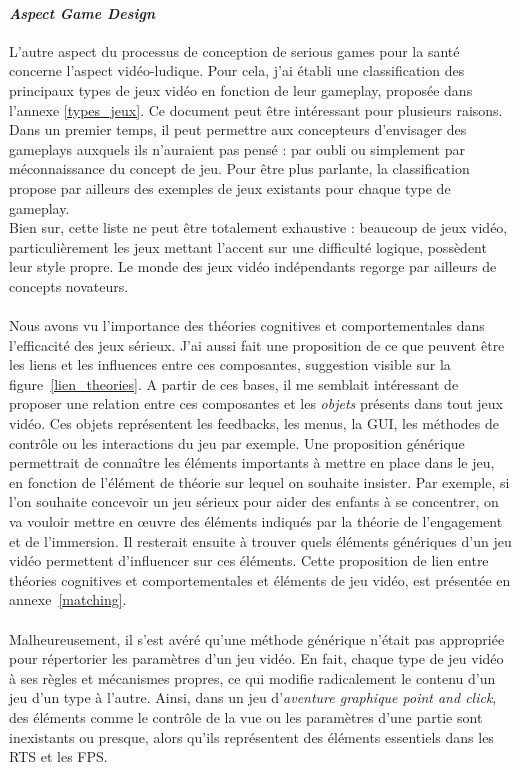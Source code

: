 			\paragraph{\emph{Aspect Game Design}\\}
L'autre aspect du processus de conception de serious games pour la santé concerne l'aspect vidéo-ludique. Pour cela, j'ai établi une classification des principaux types de jeux vidéo en fonction de leur gameplay, proposée dans l'annexe \ref{types_jeux}. Ce document peut être intéressant pour plusieurs raisons. Dans un premier temps, il peut permettre aux concepteurs d'envisager des gameplays auxquels ils n'auraient pas pensé : par oubli ou simplement par méconnaissance du concept de jeu. Pour être plus parlante, la classification propose par ailleurs des exemples de jeux existants pour chaque type de gameplay. \\
Bien sur, cette liste ne peut être totalement exhaustive : beaucoup de jeux vidéo, particulièrement les jeux mettant l'accent sur une difficulté logique, possèdent leur style propre. Le monde des jeux vidéo indépendants regorge par ailleurs de concepts novateurs.

			\paragraph{}
Nous avons vu l'importance des théories cognitives et comportementales dans l'efficacité des jeux sérieux. J'ai aussi fait une proposition de ce que peuvent être les liens et les influences entre ces composantes, suggestion visible sur la figure~\ref{lien_theories}. A partir de ces bases, il me semblait intéressant de proposer une relation entre ces composantes et les \emph{objets} présents dans tout jeux vidéo. Ces objets représentent les feedbacks, les menus, la GUI, les méthodes de contrôle ou les interactions du jeu par exemple. Une proposition générique permettrait de connaître les éléments importants à mettre en place dans le jeu, en fonction de l'élément de théorie sur lequel on souhaite insister. Par exemple, si l'on souhaite concevoir un jeu sérieux pour aider des enfants à se concentrer, on va vouloir mettre en œuvre des éléments indiqués par la théorie de l'engagement et de l'immersion. Il resterait ensuite à trouver quels éléments génériques d'un jeu vidéo permettent d'influencer sur ces éléments.
Cette proposition de lien entre théories cognitives et comportementales et éléments de jeu vidéo, est présentée en annexe~\ref{matching}.

\paragraph{}Malheureusement, il s'est avéré qu'une méthode générique n'était pas appropriée pour répertorier les paramètres d'un jeu vidéo. En fait, chaque type de jeu vidéo à ses règles et mécanismes propres, ce qui modifie radicalement le contenu d'un jeu d'un type à l'autre. Ainsi, dans un jeu d'\emph{aventure graphique point and click}, des éléments comme le contrôle de la vue ou les paramètres d'une partie sont inexistants ou presque, alors qu'ils représentent des éléments essentiels dans les RTS et les FPS.
